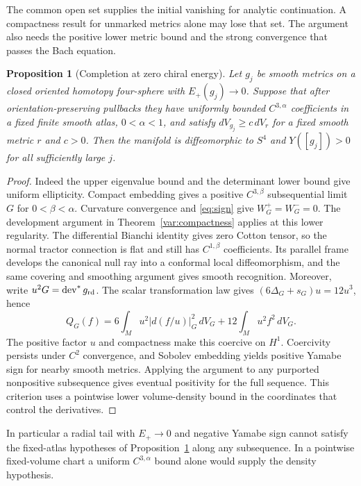 \documentclass[11pt]{article}
\numberwithin{equation}{section}
\newtheorem{proposition}[theorem]{Proposition}
\theoremstyle{definition}
\theoremstyle{remark}
\begin{document}
The common open set supplies the initial vanishing for analytic
continuation. A compactness result for unmarked metrics alone may
lose that set. The argument also needs the positive lower metric
bound and the strong convergence that passes the Bach equation.

\begin{proposition}[Completion at zero chiral energy]\label{var:zeroenergy}
Let \(g_j\) be smooth metrics on a closed oriented homotopy four-sphere
with \(E_+(g_j)\to0\). Suppose that after orientation-preserving
pullbacks they have uniformly bounded \(C^{3,\alpha}\) coefficients in
a fixed finite smooth atlas, \(0<\alpha<1\), and satisfy
\(dV_{g_j}\ge c\,dV_r\) for a fixed smooth metric \(r\) and \(c>0\).
Then the manifold is diffeomorphic to \(S^4\) and
\(Y([g_j])>0\) for all sufficiently large \(j\).
\end{proposition}
\begin{proof}
Indeed the upper eigenvalue bound and the determinant
lower bound give uniform ellipticity. Compact embedding gives a
positive \(C^{3,\beta}\) subsequential limit \(G\) for
\(0<\beta<\alpha\). Curvature convergence and \eqref{eq:sign}
give \(W_G^+=W_G^-=0\). The development argument in Theorem~\ref{var:compactness} applies at
this lower regularity. The differential Bianchi identity gives zero
Cotton tensor, so the normal tractor connection is flat and still has
\(C^{1,\beta}\) coefficients. Its parallel frame develops the canonical
null ray into a conformal local diffeomorphism, and the same covering
and smoothing argument gives smooth recognition. Moreover, write
\(u^2G=\operatorname{dev}^*g_{\rm rd}\). The scalar transformation
law gives \((6\Delta_G+s_G)u=12u^3\), hence
\[
 Q_G(f)=6\int_M u^2|d(f/u)|_G^2\,dV_G+
             12\int_M u^2 f^2\,dV_G.
\]
The positive factor \(u\) and compactness make this coercive on
\(H^1\). Coercivity persists under \(C^2\) convergence, and Sobolev
embedding yields positive Yamabe sign for nearby smooth metrics.
Applying the argument to any purported nonpositive subsequence gives
eventual positivity for the full sequence. This criterion uses a
pointwise lower volume-density bound in the coordinates that control
the derivatives.
\end{proof}

In particular a radial tail with \(E_+\to0\) and negative Yamabe sign
cannot satisfy the fixed-atlas hypotheses of Proposition~\ref{var:zeroenergy}
along any subsequence. In a pointwise fixed-volume chart a uniform
\(C^{3,\alpha}\) bound alone would supply the density hypothesis.
\end{document}
